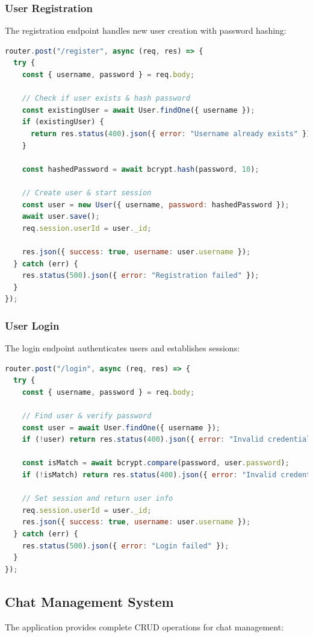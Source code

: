 \documentclass[12pt,a4paper]{article}
\begin{document}
\subsubsection{User Registration}
The registration endpoint handles new user creation with password hashing:
\begin{lstlisting}[language=JavaScript]
router.post("/register", async (req, res) => {
  try {
    const { username, password } = req.body;

    // Check if user exists & hash password
    const existingUser = await User.findOne({ username });
    if (existingUser) {
      return res.status(400).json({ error: "Username already exists" });
    }

    const hashedPassword = await bcrypt.hash(password, 10);

    // Create user & start session
    const user = new User({ username, password: hashedPassword });
    await user.save();
    req.session.userId = user._id;

    res.json({ success: true, username: user.username });
  } catch (err) {
    res.status(500).json({ error: "Registration failed" });
  }
});
\end{lstlisting}

\subsubsection{User Login}
The login endpoint authenticates users and establishes sessions:
\begin{lstlisting}[language=JavaScript]
router.post("/login", async (req, res) => {
  try {
    const { username, password } = req.body;

    // Find user & verify password
    const user = await User.findOne({ username });
    if (!user) return res.status(400).json({ error: "Invalid credentials" });

    const isMatch = await bcrypt.compare(password, user.password);
    if (!isMatch) return res.status(400).json({ error: "Invalid credentials" });

    // Set session and return user info
    req.session.userId = user._id;
    res.json({ success: true, username: user.username });
  } catch (err) {
    res.status(500).json({ error: "Login failed" });
  }
});
\end{lstlisting}

\subsection{Chat Management System}
The application provides complete CRUD operations for chat management:
\end{document}
